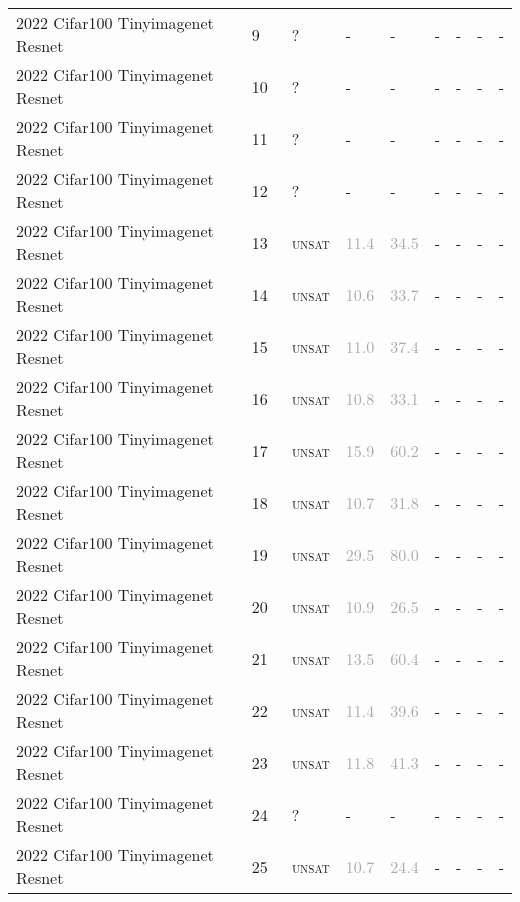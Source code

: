 \begin{center}
{\begin{longtable}{@{}lllllllll@{}}
2022 Cifar100 Tinyimagenet Resnet & 9 & ~? & - & - & - & - & - & - \\
2022 Cifar100 Tinyimagenet Resnet & 10 & ~? & - & - & - & - & - & - \\
2022 Cifar100 Tinyimagenet Resnet & 11 & ~? & - & - & - & - & - & - \\
2022 Cifar100 Tinyimagenet Resnet & 12 & ~? & - & - & - & - & - & - \\
2022 Cifar100 Tinyimagenet Resnet & 13 & ~\textsc{unsat} & \textcolor{darkgray}{11.4} & \textcolor{darkgray}{34.5} & - & - & - & - \\
2022 Cifar100 Tinyimagenet Resnet & 14 & ~\textsc{unsat} & \textcolor{darkgray}{10.6} & \textcolor{darkgray}{33.7} & - & - & - & - \\
2022 Cifar100 Tinyimagenet Resnet & 15 & ~\textsc{unsat} & \textcolor{darkgray}{11.0} & \textcolor{darkgray}{37.4} & - & - & - & - \\
2022 Cifar100 Tinyimagenet Resnet & 16 & ~\textsc{unsat} & \textcolor{darkgray}{10.8} & \textcolor{darkgray}{33.1} & - & - & - & - \\
2022 Cifar100 Tinyimagenet Resnet & 17 & ~\textsc{unsat} & \textcolor{darkgray}{15.9} & \textcolor{darkgray}{60.2} & - & - & - & - \\
2022 Cifar100 Tinyimagenet Resnet & 18 & ~\textsc{unsat} & \textcolor{darkgray}{10.7} & \textcolor{darkgray}{31.8} & - & - & - & - \\
2022 Cifar100 Tinyimagenet Resnet & 19 & ~\textsc{unsat} & \textcolor{darkgray}{29.5} & \textcolor{darkgray}{80.0} & - & - & - & - \\
2022 Cifar100 Tinyimagenet Resnet & 20 & ~\textsc{unsat} & \textcolor{darkgray}{10.9} & \textcolor{darkgray}{26.5} & - & - & - & - \\
2022 Cifar100 Tinyimagenet Resnet & 21 & ~\textsc{unsat} & \textcolor{darkgray}{13.5} & \textcolor{darkgray}{60.4} & - & - & - & - \\
2022 Cifar100 Tinyimagenet Resnet & 22 & ~\textsc{unsat} & \textcolor{darkgray}{11.4} & \textcolor{darkgray}{39.6} & - & - & - & - \\
2022 Cifar100 Tinyimagenet Resnet & 23 & ~\textsc{unsat} & \textcolor{darkgray}{11.8} & \textcolor{darkgray}{41.3} & - & - & - & - \\
2022 Cifar100 Tinyimagenet Resnet & 24 & ~? & - & - & - & - & - & - \\
2022 Cifar100 Tinyimagenet Resnet & 25 & ~\textsc{unsat} & \textcolor{darkgray}{10.7} & \textcolor{darkgray}{24.4} & - & - & - & - \\

\end{longtable}}
\end{center}
